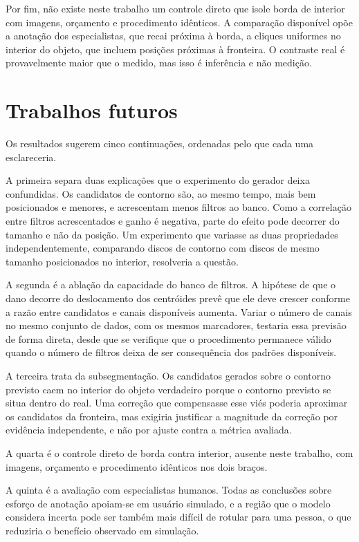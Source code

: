 Por fim, não existe neste trabalho um controle direto que isole borda de interior com imagens, orçamento e procedimento idênticos. A comparação disponível opõe a anotação dos especialistas, que recai próxima à borda, a cliques uniformes no interior do objeto, que incluem posições próximas à fronteira. O contraste real é provavelmente maior que o medido, mas isso é inferência e não medição.

\section{Trabalhos futuros}

Os resultados sugerem cinco continuações, ordenadas pelo que cada uma esclareceria.

A primeira separa duas explicações que o experimento do gerador deixa confundidas. Os candidatos de contorno são, ao mesmo tempo, mais bem posicionados e menores, e acrescentam menos filtros ao banco. Como a correlação entre filtros acrescentados e ganho é negativa, parte do efeito pode decorrer do tamanho e não da posição. Um experimento que variasse as duas propriedades independentemente, comparando discos de contorno com discos de mesmo tamanho posicionados no interior, resolveria a questão.

A segunda é a ablação da capacidade do banco de filtros. A hipótese de que o dano decorre do deslocamento dos centróides prevê que ele deve crescer conforme a razão entre candidatos e canais disponíveis aumenta. Variar o número de canais no mesmo conjunto de dados, com os mesmos marcadores, testaria essa previsão de forma direta, desde que se verifique que o procedimento permanece válido quando o número de filtros deixa de ser consequência dos padrões disponíveis.

A terceira trata da subsegmentação. Os candidatos gerados sobre o contorno previsto caem no interior do objeto verdadeiro porque o contorno previsto se situa dentro do real. Uma correção que compensasse esse viés poderia aproximar os candidatos da fronteira, mas exigiria justificar a magnitude da correção por evidência independente, e não por ajuste contra a métrica avaliada.

A quarta é o controle direto de borda contra interior, ausente neste trabalho, com imagens, orçamento e procedimento idênticos nos dois braços.

A quinta é a avaliação com especialistas humanos. Todas as conclusões sobre esforço de anotação apoiam-se em usuário simulado, e a região que o modelo considera incerta pode ser também mais difícil de rotular para uma pessoa, o que reduziria o benefício observado em simulação.

